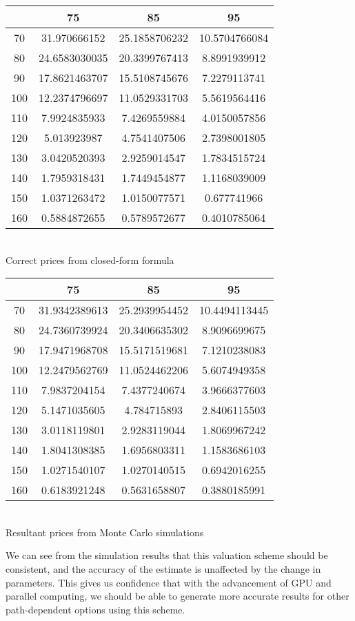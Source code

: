 \begin{center}
\begin{tabular}{|c|c|c|c|}
\hline 
 & 75 & 85 & 95\\
\hline
70&31.970666152&25.1858706232&10.5704766084\\
80&24.6583030035&20.3399767413&8.8991939912\\
90&17.8621463707&15.5108745676&7.2279113741\\
100&12.2374796697&11.0529331703&5.5619564416\\
110&7.9924835933&7.4269559884&4.0150057856\\
120&5.013923987&4.7541407506&2.7398001805\\
130&3.0420520393&2.9259014547&1.7834515724\\
140&1.7959318431&1.7449454877&1.1168039009\\
150&1.0371263472&1.0150077571&0.677741966\\
160&0.5884872655&0.5789572677&0.4010785064\\
\hline
\end{tabular}
\\[1mm]Correct prices from closed-form formula
\\[3mm]
\begin{tabular}{|c|c|c|c|}
\hline
 & 75 & 85 & 95\\
\hline
70&31.9342389613&25.2939954452&10.4494113445\\
80&24.7360739924&20.3406635302&8.9096699675\\
90&17.9471968708&15.5171519681&7.1210238083\\
100&12.2479562769&11.0524462206&5.6074949358\\
110&7.9837204154&7.4377240674&3.9666377603\\
120&5.1471035605&4.784715893&2.8406115503\\
130&3.0118119801&2.9283119044&1.8069967242\\
140&1.8041308385&1.6956803311&1.1583686103\\
150&1.0271540107&1.0270140515&0.6942016255\\
160&0.6183921248&0.5631658807&0.3880185991\\
\hline
\end{tabular}
\\[1mm] Resultant prices from Monte Carlo simulations
\end{center}
We can see from the simulation results that this valuation scheme should be consistent, and the accuracy of the estimate is unaffected by the change in parameters. This gives us confidence that with the advancement of GPU and parallel computing, we should be able to generate more accurate results for other path-dependent options using this scheme.
\newpage

